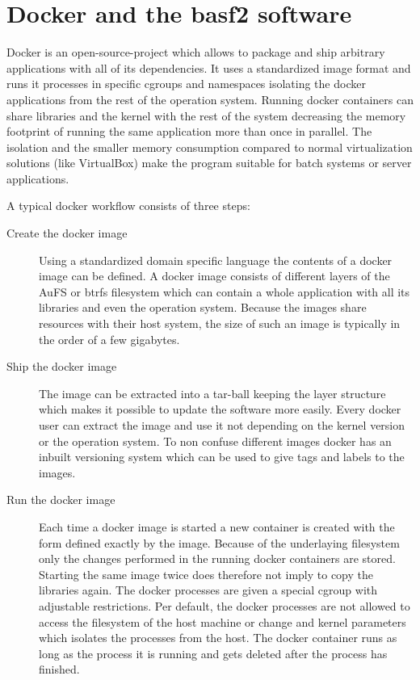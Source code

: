 \section{Docker and the basf2 software}

Docker is an open-source-project \cite{docker} which allows to package and ship arbitrary applications with all of its dependencies. It uses a standardized image format and runs it processes in specific cgroups and namespaces isolating the docker applications from the rest of the operation system. Running docker containers can share libraries and the kernel with the rest of the system decreasing the memory footprint of running the same application more than once in parallel. The isolation and the smaller memory consumption compared to normal virtualization solutions (like VirtualBox) make the program suitable for batch systems or server applications.

A typical docker workflow consists of three steps:
\begin{description}
  \item[Create the docker image] Using a standardized domain specific language the contents of a docker image can be defined. A docker image consists of different layers of the AuFS or btrfs filesystem which can contain a whole application with all its libraries and even the operation system. Because the images share resources with their host system, the size of such an image is typically in the order of a few gigabytes.
  \item[Ship the docker image] The image can be extracted into a tar-ball keeping the layer structure which makes it possible to update the software more easily. Every docker user can extract the image and use it not depending on the kernel version or the operation system. To non confuse different images docker has an inbuilt versioning system which can be used to give tags and labels to the images.
  \item[Run the docker image] Each time a docker image is started a new container is created with the form defined exactly by the image. Because of the underlaying filesystem only the changes performed in the running docker containers are stored. Starting the same image twice does therefore not imply to copy the libraries again. The docker processes are given a special cgroup with adjustable restrictions. Per default, the docker processes are not allowed to access the filesystem of the host machine or change and kernel parameters which isolates the processes from the host. The docker container runs as long as the process it is running and gets deleted after the process has finished.
\end{description}

